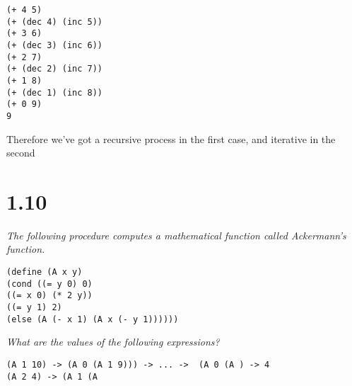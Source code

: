 \documentclass[11pt,oneside,titlepage]{book}
\begin{document}
\begin{verbatim}
(+ 4 5)
(+ (dec 4) (inc 5))
(+ 3 6)
(+ (dec 3) (inc 6))
(+ 2 7)
(+ (dec 2) (inc 7))
(+ 1 8)
(+ (dec 1) (inc 8))
(+ 0 9)
9
\end{verbatim}

Therefore we've got a recursive process in the first case, and iterative in the second

\section*{1.10}

\textit{ The following procedure computes a mathematical function called Ackermann’s function.}

\begin{verbatim}
(define (A x y)
(cond ((= y 0) 0)
((= x 0) (* 2 y))
((= y 1) 2)
(else (A (- x 1) (A x (- y 1))))))
\end{verbatim}

\textit{What are the values of the following expressions?}

\begin{verbatim}
(A 1 10) -> (A 0 (A 1 9))) -> ... ->  (A 0 (A ) -> 4
(A 2 4) -> (A 1 (A 
\end{verbatim}
\end{document}
